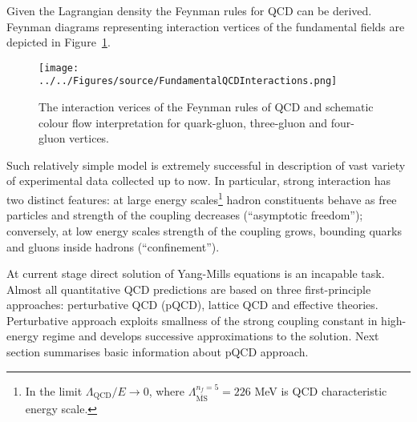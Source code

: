 Given the Lagrangian density the Feynman rules for QCD can be derived.  Feynman diagrams representing interaction vertices of the fundamental fields are depicted in Figure~\ref{fig:FundamentalQCDInteractions}.
\begin{figure}[t]
	\centering
		\texttt{[image: ../../Figures/source/FundamentalQCDInteractions.png]}
	\caption{The interaction verices of the Feynman rules of QCD and schematic colour flow interpretation for quark-gluon, three-gluon and four-gluon vertices.}
	\label{fig:FundamentalQCDInteractions}
\end{figure}

Such relatively simple model is extremely successful in description of vast variety of experimental data collected up to now. In particular, strong interaction has two distinct features: at large energy scales\footnote{In the limit $\Lambda_\mathrm{QCD}/E\rightarrow 0$, where $\Lambda^{n_f=5}_{\overline{\mathrm{MS}}}=226$ MeV is QCD characteristic energy scale.} hadron constituents behave as free particles and strength of the coupling decreases (``asymptotic freedom''); conversely, at low energy scales strength of the coupling grows, bounding quarks and gluons inside hadrons (``confinement'').  
 
At current stage direct solution of Yang-Mills equations is an incapable task. Almost all quantitative QCD predictions are based on three first-principle approaches: perturbative QCD (pQCD), lattice QCD and effective theories. Perturbative approach exploits smallness of the strong coupling constant in high-energy regime and develops successive approximations to the solution. Next section summarises basic information about pQCD approach.

